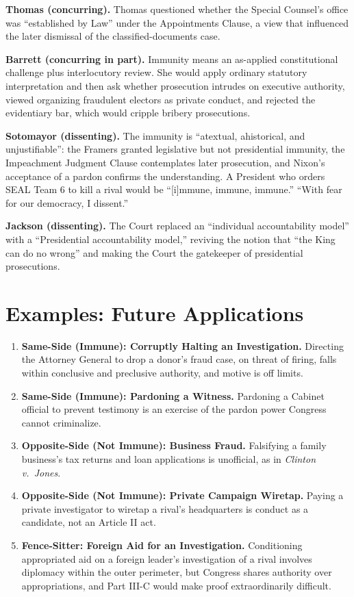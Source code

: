 \documentclass[12pt]{article}
\begin{document}
\textbf{Thomas (concurring).} Thomas questioned whether the Special Counsel's office was ``established by Law'' under the Appointments Clause, a view that influenced the later dismissal of the classified-documents case.

\textbf{Barrett (concurring in part).} Immunity means an as-applied constitutional challenge plus interlocutory review. She would apply ordinary statutory interpretation and then ask whether prosecution intrudes on executive authority, viewed organizing fraudulent electors as private conduct, and rejected the evidentiary bar, which would cripple bribery prosecutions.

\textbf{Sotomayor (dissenting).} The immunity is ``atextual, ahistorical, and unjustifiable'': the Framers granted legislative but not presidential immunity, the Impeachment Judgment Clause contemplates later prosecution, and Nixon's acceptance of a pardon confirms the understanding. A President who orders SEAL Team 6 to kill a rival would be ``[i]mmune, immune, immune.'' ``With fear for our democracy, I dissent.''

\textbf{Jackson (dissenting).} The Court replaced an ``individual accountability model'' with a ``Presidential accountability model,'' reviving the notion that ``the King can do no wrong'' and making the Court the gatekeeper of presidential prosecutions.

\section{Examples: Future Applications}

\begin{enumerate}
\item \textbf{Same-Side (Immune): Corruptly Halting an Investigation.} Directing the Attorney General to drop a donor's fraud case, on threat of firing, falls within conclusive and preclusive authority, and motive is off limits.
\item \textbf{Same-Side (Immune): Pardoning a Witness.} Pardoning a Cabinet official to prevent testimony is an exercise of the pardon power Congress cannot criminalize.
\item \textbf{Opposite-Side (Not Immune): Business Fraud.} Falsifying a family business's tax returns and loan applications is unofficial, as in \textit{Clinton v.\ Jones}.
\item \textbf{Opposite-Side (Not Immune): Private Campaign Wiretap.} Paying a private investigator to wiretap a rival's headquarters is conduct as a candidate, not an Article II act.
\item \textbf{Fence-Sitter: Foreign Aid for an Investigation.} Conditioning appropriated aid on a foreign leader's investigation of a rival involves diplomacy within the outer perimeter, but Congress shares authority over appropriations, and Part III-C would make proof extraordinarily difficult.
\end{enumerate}
\end{document}
